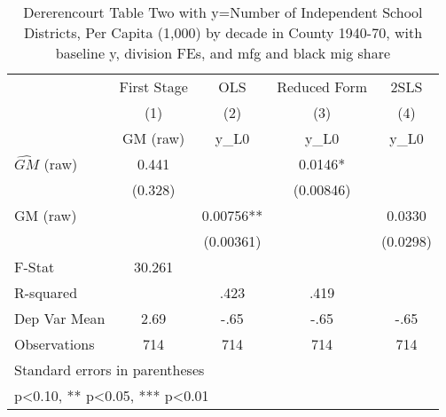 \begin{table}[htbp]\centering
\def\sym#1{\ifmmode^{#1}\else\(^{#1}\)\fi}
\caption{Dererencourt Table Two with y=Number of Independent School Districts, Per Capita (1,000) by decade in County 1940-70, with baseline y, division FEs, and mfg and black mig share}
\begin{tabular}{l*{4}{c}}
\toprule
                    & First Stage   &         OLS   &Reduced Form   &        2SLS   \\
                    &\multicolumn{1}{c}{(1)}&\multicolumn{1}{c}{(2)}&\multicolumn{1}{c}{(3)}&\multicolumn{1}{c}{(4)}\\
                    &\multicolumn{1}{c}{GM  (raw)}&\multicolumn{1}{c}{y\_L0}&\multicolumn{1}{c}{y\_L0}&\multicolumn{1}{c}{y\_L0}\\
\midrule
$\hat{GM}$ (raw)    &       0.441   &               &      0.0146*  &               \\
                    &     (0.328)   &               &   (0.00846)   &               \\
\addlinespace
GM  (raw)           &               &     0.00756** &               &      0.0330   \\
                    &               &   (0.00361)   &               &    (0.0298)   \\
\midrule
F-Stat              &      30.261   &               &               &               \\
R-squared           &               &        .423   &        .419   &               \\
Dep Var Mean        &        2.69   &        -.65   &        -.65   &        -.65   \\
Observations        &         714   &         714   &         714   &         714   \\
\bottomrule
\multicolumn{5}{l}{\footnotesize Standard errors in parentheses}\\
\multicolumn{5}{l}{\footnotesize * p<0.10, ** p<0.05, *** p<0.01}\\
\end{tabular}
\end{table}
